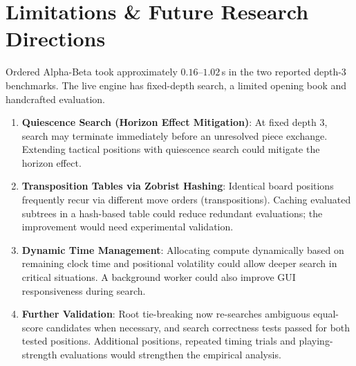 \documentclass[11pt,a4paper]{article}
\begin{document}
\section{Limitations \& Future Research Directions}
Ordered Alpha-Beta took approximately $0.16$--$1.02$\,s in the two reported depth-3 benchmarks. The live engine has fixed-depth search, a limited opening book and handcrafted evaluation.
\begin{enumerate}[leftmargin=*]
    \item \textbf{Quiescence Search (Horizon Effect Mitigation)}: At fixed depth 3, search may terminate immediately before an unresolved piece exchange. Extending tactical positions with quiescence search could mitigate the horizon effect.
    \item \textbf{Transposition Tables via Zobrist Hashing}: Identical board positions frequently recur via different move orders (transpositions). Caching evaluated subtrees in a hash-based table could reduce redundant evaluations; the improvement would need experimental validation.
    \item \textbf{Dynamic Time Management}: Allocating compute dynamically based on remaining clock time and positional volatility could allow deeper search in critical situations. A background worker could also improve GUI responsiveness during search.
    \item \textbf{Further Validation}: Root tie-breaking now re-searches ambiguous equal-score candidates when necessary, and search correctness tests passed for both tested positions. Additional positions, repeated timing trials and playing-strength evaluations would strengthen the empirical analysis.
\end{enumerate}
\end{document}
